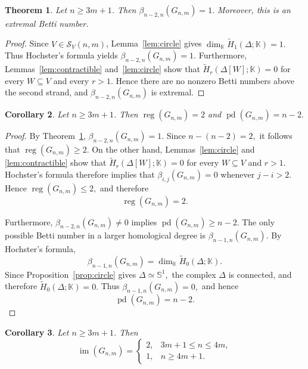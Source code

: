 \documentclass[12pt,reqno]{amsart}
\newtheorem{theorem}{Theorem}[section]
\newtheorem{corollary}[theorem]{Corollary}
\theoremstyle{definition}
\numberwithin{equation}{section}
\def\K{\mathbb{K}}
\newcommand{\pd}{\operatorname{pd}}
\newcommand{\reg}{\operatorname{reg}}
\begin{document}
\begin{theorem}\label{thm:extremal}
Let $n\geq3m+1$. Then \( \beta_{n-2,n}(G_{n,m})=1. \)
Moreover, this is an extremal Betti number.
\end{theorem}

\begin{proof}
Since $V\in\mathcal{S}_V(n,m)$, Lemma~\ref{lem:circle} gives \( \dim_{\K}\widetilde H_1(\Delta;\K)=1. \)
Thus Hochster's formula yields \( \beta_{n-2,n}(G_{n,m})=1. \)
Furthermore, Lemmas~\ref{lem:contractible} and~\ref{lem:circle} show that
\( \widetilde H_r(\Delta[W];\K)=0 \)
for every $W\subseteq V$ and every $r>1$. Hence there are no nonzero Betti
numbers above the second strand, and $\beta_{n-2,n}(G_{n,m})$ is extremal.
\end{proof}

\begin{corollary}\label{cor:regpd}
	Let $n\geq3m+1$. Then \( \reg(G_{n,m})=2 \) and 
	\( \pd(G_{n,m})=n-2. \)
\end{corollary}

\begin{proof}
	By Theorem~\ref{thm:extremal}, \( \beta_{n-2,n}(G_{n,m})=1. \)
	Since \( n-(n-2)=2, \)
	it follows that \( \reg(G_{n,m})\geq2. \)
	On the other hand, Lemmas~\ref{lem:circle} and
	\ref{lem:contractible} show that \( \widetilde H_r(\Delta[W];\K)=0 \)
	for every \( W\subseteq V \) and \( r>1 \).
Hochster's formula therefore implies that \( \beta_{i,j}(G_{n,m})=0 \) whenever \( j-i>2. \)
	Hence \( \reg(G_{n,m})\leq2, \) and therefore
	\[
	\reg(G_{n,m})=2.
	\]
	
	Furthermore, \( \beta_{n-2,n}(G_{n,m})\neq0 \)
	implies \( \pd(G_{n,m})\geq n-2. \)
	The only possible Betti number in a larger homological degree is
	$\beta_{n-1,n}(G_{n,m})$. By Hochster's formula,
	\[
	\beta_{n-1,n}(G_{n,m})
	=
	\dim_{\K}\widetilde H_0(\Delta;\K).
	\]
	Since Proposition~\ref{prop:circle} gives \( \Delta\simeq\mathbb{S}^{1}, \) the complex $\Delta$ is connected, and therefore \( \widetilde H_0(\Delta;\K)=0. \)
	Thus \( \beta_{n-1,n}(G_{n,m})=0, \)
	and hence
	\[
	\pd(G_{n,m})=n-2.
	\]
\end{proof}
\begin{corollary}\label{cor:im}
	Let $n\geq3m+1$. Then
	\[
	\operatorname{im}(G_{n,m})
	=
	\begin{cases}
		2, & 3m+1\leq n\leq4m,\\[2mm]
		1, & n\geq4m+1.
	\end{cases}
	\]
\end{corollary}
\end{document}
